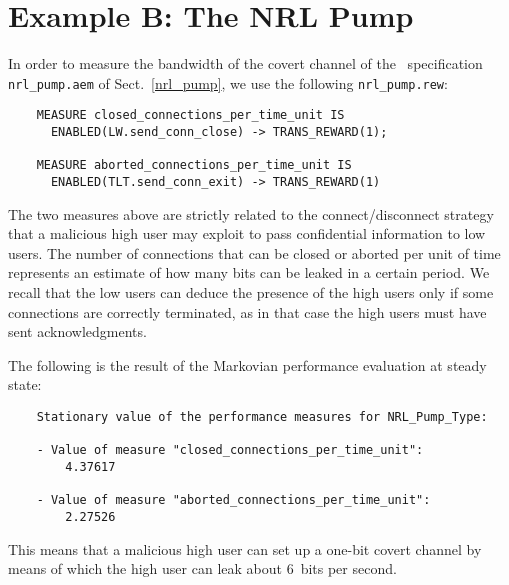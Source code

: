 \section{Example B: The NRL Pump}

In order to measure the bandwidth of the covert channel of the \aemilia\ specification {\tt nrl\_pump.aem}
of Sect.~\ref{nrl_pump}, we use the following {\tt nrl\_pump.rew}:

        \begin{verbatim}
    MEASURE closed_connections_per_time_unit IS
      ENABLED(LW.send_conn_close) -> TRANS_REWARD(1);

    MEASURE aborted_connections_per_time_unit IS
      ENABLED(TLT.send_conn_exit) -> TRANS_REWARD(1)
        \end{verbatim}

\noindent The two measures above are strictly related to the connect/disconnect strategy that a malicious
high user may exploit to pass confidential information to low users. The number of connections that can be
closed or aborted per unit of time represents an estimate of how many bits can be leaked in a certain
period. We recall that the low users can deduce the presence of the high users only if some connections are
correctly terminated, as in that case the high users must have sent acknowledgments.

The following is the result of the Markovian performance evaluation at steady state:

        \begin{verbatim}
    Stationary value of the performance measures for NRL_Pump_Type:

    - Value of measure "closed_connections_per_time_unit":
        4.37617

    - Value of measure "aborted_connections_per_time_unit":
        2.27526
        \end{verbatim}

\noindent This means that a malicious high user can set up a one-bit covert channel by means of which the
high user can leak about 6~bits per second.



